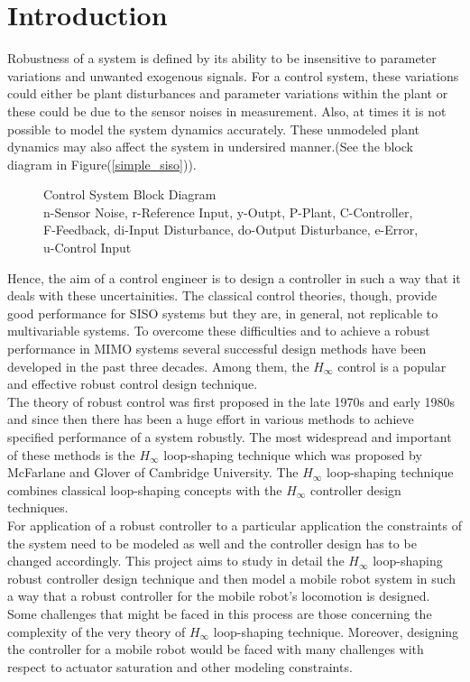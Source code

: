 \documentclass[a4paper,12pt]{article}
\begin{document}
\section{Introduction}
Robustness of a system is defined by its ability to be insensitive to parameter variations and unwanted exogenous signals. For a control system, these variations could either be plant disturbances and parameter variations within the plant or these could be due to the sensor noises in measurement. Also, at times it is not possible to model the system dynamics accurately. These unmodeled plant dynamics may also affect the system in undersired manner.(See the block diagram in Figure(\ref{simple_siso})).
\begin{figure}[H]

			  \centering
			  
			  \caption{Control System Block Diagram\\ \footnotesize n-Sensor Noise, r-Reference Input, y-Outpt, P-Plant, C-Controller, F-Feedback, di-Input Disturbance, do-Output Disturbance, e-Error, u-Control Input}
			 \label{simple}
		\end{figure}	
	 Hence, the aim of a control engineer is to design a controller in such a way that it deals with these uncertainities. The classical control theories, though, provide good performance for SISO systems but they are, in general, not replicable to multivariable systems. To overcome these
difficulties and to achieve a robust performance in MIMO systems several successful design methods have been developed in the past three decades. Among them, the $H_{\infty}$ control is a popular and effective robust control design technique.  \\
The theory of robust control was first proposed in the late 1970s and early 1980s and since then there has been a huge effort in various methods to achieve specified performance of a system robustly. The most widespread and important of these methods is the $H_{\infty}$ loop-shaping technique which was proposed by McFarlane and Glover of Cambridge University. The $H_{\infty}$ loop-shaping technique combines classical loop-shaping concepts with the $H_{\infty}$ controller design techniques.  \\
For application of a robust controller to a particular application the constraints of the system need to be modeled as well and the controller design has to be changed accordingly. This project aims to study in detail the $H_{\infty}$ loop-shaping robust controller design technique and then model a mobile robot system in such a way that a robust controller for the mobile robot's locomotion is designed. Some challenges that might be faced in this process are those concerning the complexity of the very theory of  $H_{\infty}$	 loop-shaping technique. Moreover, designing the controller for a mobile robot would be faced with many challenges with respect to actuator saturation and other modeling constraints.\\
\end{document}
